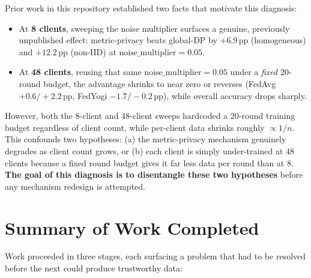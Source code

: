 \documentclass[11pt]{article}
\newcommand{\pp}{\,\text{pp}}
\begin{document}
Prior work in this repository established two facts that motivate this diagnosis:
\begin{itemize}[leftmargin=1.4em]
    \item At \textbf{8 clients}, sweeping the noise multiplier surfaces a genuine, previously
    unpublished effect: metric-privacy beats global-DP by $+6.9\pp$ (homogeneous) and $+12.2\pp$
    (non-IID) at $\text{noise\_multiplier}=0.05$.
    \item At \textbf{48 clients}, reusing that same $\text{noise\_multiplier}=0.05$ under a
    \emph{fixed} 20-round budget, the advantage shrinks to near zero or reverses
    (FedAvg $+0.6/+2.2\pp$, FedYogi $-1.7/-0.2\pp$), while overall accuracy drops sharply.
\end{itemize}

However, both the 8-client and 48-client sweeps hardcoded a 20-round training budget regardless of
client count, while per-client data shrinks roughly $\propto 1/n$. This confounds two hypotheses:
(a) the metric-privacy mechanism genuinely degrades as client count grows, or (b) each client is
simply under-trained at 48 clients because a fixed round budget gives it far less data per round
than at 8. \textbf{The goal of this diagnosis is to disentangle these two hypotheses} before any
mechanism redesign is attempted.

\section{Summary of Work Completed}

Work proceeded in three stages, each surfacing a problem that had to be resolved before the next
could produce trustworthy data:
\end{document}
